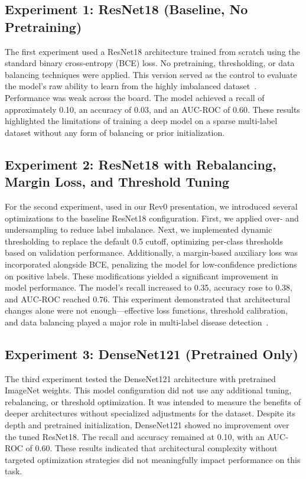 \documentclass[12pt]{article}
\begin{document}
\begin{multicols}{2}
\subsection{Experiment 1: ResNet18 (Baseline, No Pretraining)}

The first experiment used a ResNet18 architecture trained from scratch using the standard binary cross-entropy (BCE) loss. No pretraining, thresholding, or data balancing techniques were applied. This version served as the control to evaluate the model’s raw ability to learn from the highly imbalanced dataset~\cite{wang2017chestx}.
Performance was weak across the board. The model achieved a recall of approximately 0.10, an accuracy of 0.03, and an AUC-ROC of 0.60. These results highlighted the limitations of training a deep model on a sparse multi-label dataset without any form of balancing or prior initialization.

\subsection{Experiment 2: ResNet18 with Rebalancing, Margin Loss, and Threshold Tuning}

For the second experiment, used in our Rev0 presentation, we introduced several optimizations to the baseline ResNet18 configuration. First, we applied over- and undersampling to reduce label imbalance. Next, we implemented dynamic thresholding to replace the default 0.5 cutoff, optimizing per-class thresholds based on validation performance. Additionally, a margin-based auxiliary loss was incorporated alongside BCE, penalizing the model for low-confidence predictions on positive labels.
These modifications yielded a significant improvement in model performance. The model’s recall increased to 0.35, accuracy rose to 0.38, and AUC-ROC reached 0.76. This experiment demonstrated that architectural changes alone were not enough—effective loss functions, threshold calibration, and data balancing played a major role in multi-label disease detection~\cite{12}.

\subsection{Experiment 3: DenseNet121 (Pretrained Only)}

The third experiment tested the DenseNet121 architecture with pretrained ImageNet weights. This model configuration did not use any additional tuning, rebalancing, or threshold optimization. It was intended to measure the benefits of deeper architectures without specialized adjustments for the dataset.
Despite its depth and pretrained initialization, DenseNet121 showed no improvement over the tuned ResNet18. The recall and accuracy remained at 0.10, with an AUC-ROC of 0.60. These results indicated that architectural complexity without targeted optimization strategies did not meaningfully impact performance on this task.


\end{multicols}
\end{document}
